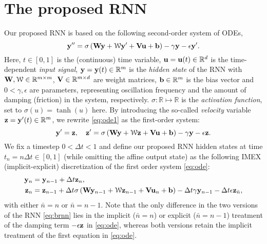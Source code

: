 \documentclass{article} \usepackage{iclr2021_conference,times}
\newcommand{\cW}{\EuScript{W}}
\newcommand{\by}{{\bf y}}
\newcommand{\bz}{{\bf z}}
\newcommand{\bW}{{\bf W}}
\newcommand{\bu}{{\bf u}}
\newcommand{\bb}{{\bf b}}
\newcommand{\bV}{{\bf V}}
\newcommand{\ep}{\epsilon}
\newcommand{\R}{{\mathbb R}}
\newcommand{\Dt}{{\Delta t}}
\begin{document}
\section{The proposed RNN}
Our proposed RNN is based on the following second-order system of ODEs, 
\begin{equation}
\label{eq:ode1}
\by^{\prime \prime} = \sigma\left(\bW \by +  {\bf \cW} \by^{\prime} + \bV \bu + \bb \right) -\gamma \by - \ep \by^{\prime}.
\end{equation}
Here, $t \in [0,1]$ is the (continuous) time variable, $\bu = \bu(t) \in  \R^d$ is the time-dependent \emph{input signal}, $\by = \by (t) \in \R^m$ is the \emph{hidden state} of the RNN with $\bW, {\bf \cW} \in \R^{m \times m}$, $\bV \in \R^{m \times d}$ are weight matrices,
$\bb \in \R^m$ is the bias vector and $0 < \gamma,\ep$ are parameters, representing oscillation frequency and the amount of damping (friction) in the system, respectively. $\sigma: \R \mapsto \R$ is the \emph{activation function}, set to $\sigma (u) = \tanh(u)$ here. By introducing the so-called \emph{velocity} variable $\bz = \by^{\prime}(t) \in \R^m$, we rewrite \eqref{eq:ode1} as the first-order system:
\begin{equation}
\label{eq:ode}
\by^{\prime} = \bz, \quad
\bz^{\prime}= \sigma\left(\bW \by +  \bf{\cW} \bz + \bV \bu + \bb \right)  - \gamma \by - \ep \bz.
\end{equation}
We fix a timestep $0 < \Dt < 1$ and define our proposed RNN hidden states at time $t_n = n \Dt \in [0,1]$ (while omitting the affine output state) as the following IMEX (implicit-explicit) discretization of the first order system \eqref{eq:ode}:
\begin{equation}
\label{eq:brnn}
\begin{aligned}
\by_n &= \by_{n-1} + \Dt \bz_n,\\
\bz_n &= \bz_{n-1} + \Dt \sigma\left(\bW\by_{n-1} +  {\bf\cW} \bz_{n-1} + \bV \bu_{n} + \bb \right) -\Dt \gamma \by_{n-1} -  \Dt \ep \bz_{\bar{n}},  
\end{aligned}
\end{equation}
with either $\bar{n} = n$ or $\bar{n}=n-1$. Note that the only difference in the two versions of the RNN \eqref{eq:brnn} lies in the implicit ($\bar{n}=n$) or explicit ($\bar{n}=n-1$) treatment of the damping term $-\ep\bz$ in \eqref{eq:ode}, whereas both versions retain the implicit treatment of the first equation in \eqref{eq:ode}.
\end{document}
